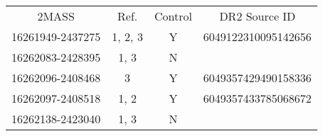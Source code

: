 \begin{table}
\begin{tabular}{cccc}
2MASS & Ref. & Control & DR2 Source ID \\
16261949-2437275 & 1, 2, 3 & Y & 6049122310095142656 \\
16262083-2428395 & 1, 3 & N &  \\
16262096-2408468 & 3 & Y & 6049357429490158336 \\
16262097-2408518 & 1, 2 & Y & 6049357433785068672 \\
16262138-2423040 & 1, 3 & N &  \\
\end{tabular}
\end{table}
